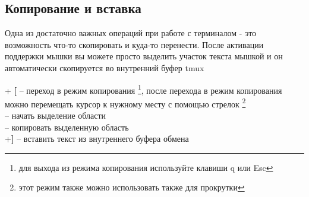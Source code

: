 \subsection*{Копирование и вставка}

Одна из достаточно важных операций при работе с терминалом - это возможность что-то скопировать и куда-то перенести. После активации поддержки мышки вы можете просто выделить участок текста мышкой и он автоматически скопируется во внутренний буфер tmux

+ \textbf{[} -- переход в режим копирования \footnote{для выхода из режима копирования используйте клавиши q или Esc}, после перехода в режим копирования можно перемещать курсор к нужному месту с помощью стрелок \footnote{этот режим также можно использовать также для прокрутки}\\
 -- начать выделение области\\
 -- копировать выделенную область\\
+\textbf{]} -- вставить текст из внутреннего буфера обмена \\



